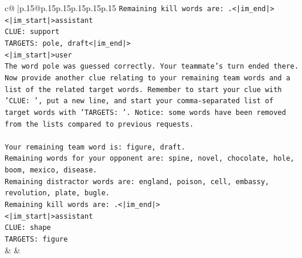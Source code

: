 \documentclass{article}
\begin{document}
{\begin{supertabular}{c@{$\;$}|p{.15\linewidth}@{}p{.15\linewidth}p{.15\linewidth}p{.15\linewidth}p{.15\linewidth}p{.15\linewidth}}
{{{\texttt{Remaining kill words are: .<|im\_end|>} \\
\texttt{<|im\_start|>assistant} \\
\texttt{CLUE: support} \\
\texttt{TARGETS: pole, draft<|im\_end|>} \\
\texttt{<|im\_start|>user} \\
\texttt{The word pole was guessed correctly. Your teammate's turn ended there.} \\
\texttt{Now provide another clue relating to your remaining team words and a list of the related target words. Remember to start your clue with 'CLUE: ', put a new line, and start your comma{-}separated list of target words with 'TARGETS: '. Notice: some words have been removed from the lists compared to previous requests.} \\
\\ 
\texttt{Your remaining team word is: figure, draft.} \\
\texttt{Remaining words for your opponent are: spine, novel, chocolate, hole, boom, mexico, disease.} \\
\texttt{Remaining distractor words are: england, poison, cell, embassy, revolution, plate, bugle.} \\
\texttt{Remaining kill words are: .<|im\_end|>} \\
\texttt{<|im\_start|>assistant} \\
\texttt{CLUE: shape} \\
\texttt{TARGETS: figure} \\
            }
        }
    }
    & & \\ \\


\end{supertabular}}
\end{document}
